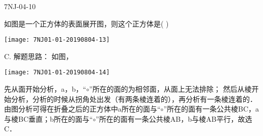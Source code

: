 \begin{defproblem}{7NJ-04-10}%
\begin{onlyproblem}%
如图是一个正方体的表面展开图，则这个正方体是(    ) 
\begin{center}
\texttt{[image: 7NJ01-01-20190804-13]}
\end{center}

\end{onlyproblem}%
\begin{onlysolution}%
\begin{solution}%
C.
解题思路： 如图，\begin{center}
\texttt{[image: 7NJ01-01-20190804-14]}
\end{center}
先从面开始分析，a，b，“$\circ$”所在的面的为相邻面，从面上无法排除； 然后从棱开始分析，分析的时候从拐角处出发（有两条棱连着的），再分析有一条棱连着的． 由图分析可得在折叠之后的正方体中a所在的面与“$\circ$”所在的面有一条公共棱BC，a与棱BC垂直；b所在的面与“$\circ$”所在的面有一条公共棱AB，b与棱AB平行，故选C． 
\end{solution}%
\end{onlysolution}%
\end{defproblem}






